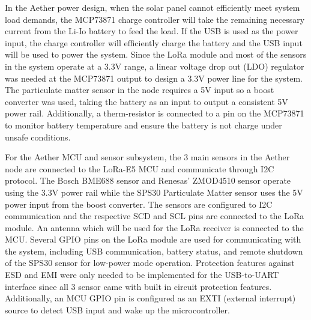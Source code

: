 In the Aether power design, when the solar panel cannot efficiently meet system load demands, the MCP73871 charge controller will take the remaining necessary current from the Li-Io battery to feed the load. If the USB is used as the power input, the charge controller will efficiently charge the battery and the USB input will be used to power the system. Since the LoRa module and most of the sensors in the system operate at a 3.3V range, a linear voltage drop out (LDO) regulator was needed at the MCP73871 output to design a 3.3V power line for the system. The particulate matter sensor in the node requires a 5V input so a boost converter was used, taking the battery as an input to output a consistent 5V power rail. Additionally, a therm-resistor is connected to a pin on the MCP73871 to monitor battery temperature and ensure the battery is not charge under unsafe conditions. 

For the Aether MCU and sensor subsystem, the 3 main sensors in the Aether node are connected to the LoRa-E5 MCU and communicate through I2C protocol. The Bosch BME688 sensor and Renesas' ZMOD4510 sensor operate using the 3.3V power rail while the SPS30 Particulate Matter sensor uses the 5V power input from the boost converter. The sensors are configured to I2C communication and the respective SCD and SCL pins are connected to the LoRa module. An antenna which will be used for the LoRa receiver is connected to the MCU. Several GPIO pins on the LoRa module are used for communicating with the system, including USB communication, battery status, and remote shutdown of the SPS30 sensor for low-power mode operation. Protection features against ESD and EMI were only needed to be implemented for the USB-to-UART interface since all 3 sensor came with built in circuit protection features. Additionally, an MCU GPIO pin is configured as an EXTI (external interrupt) source to detect USB input and wake up the microcontroller.
 
